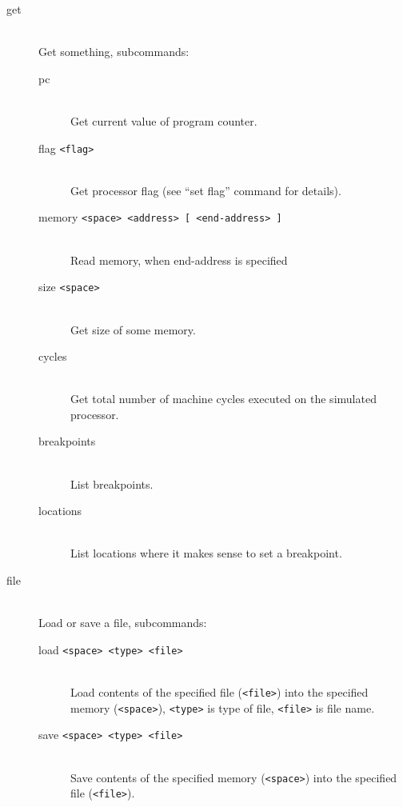 \begin{description}
            \item[get]~\\
                Get something, subcommands:
                \begin{description}
                    \item[pc]~\\
                        Get current value of program counter.
                    \item[flag \texttt{<flag>}]~\\
                        Get processor flag (see ``set flag'' command for details).
                    \item[memory \texttt{<space> <address> {[} <end-address> {]}}]~\\
                        Read memory, when end-address is specified
                    \item[size \texttt{<space>}]~\\
                        Get size of some memory.
                    \item[cycles]~\\
                        Get total number of machine cycles executed on the simulated processor.
                    \item[breakpoints]~\\
                        List breakpoints.
                    \item[locations]~\\
                        List locations where it makes sense to set a breakpoint.
                \end{description}

            \item[file]~\\
                Load or save a file, subcommands:
                \begin{description}
                    \item[load \texttt{<space> <type> <file>}]~\\
                        Load contents of the specified file (\texttt{<file>}) into the specified memory (\texttt{<space>}), \texttt{<type>} is type of file, \texttt{<file>} is file name.
                    \item[save \texttt{<space> <type> <file>}]~\\
                        Save contents of the specified memory (\texttt{<space>}) into the specified file (\texttt{<file>}).
                \end{description}


\end{description}
